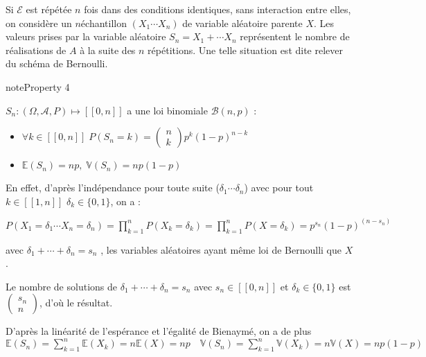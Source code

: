 \documentclass[letterpaper,10pt,english]{jupyterBook}
\begin{document}
\sphinxAtStartPar
Si \(\mathcal E\) est répétée \(n\) fois dans des conditions identiques, sans interaction entre elles, on considère un \(n\)\sphinxhyphen{}échantillon \((X_1\cdots X_n)\) de variable aléatoire parente \(X\). Les valeurs prises par la variable aléatoire \(S_n=X_1+\cdots X_n\) représentent le nombre de réalisations de \(A\) à la suite des \(n\) répétitions. Une telle situation est dite relever du schéma de Bernoulli.
\label{elemstats:property-1}
\begin{sphinxadmonition}{note}{Property 4}



\sphinxAtStartPar
\(S_n:(\Omega,\mathcal A,P)\mapsto [\![0,n]\!]\) a une loi binomiale \(\mathcal{B}(n,p)\) :
\begin{itemize}
\item {} 
\sphinxAtStartPar
\(\forall k\in[\![0,n]\!]\; P(S_n=k)=\begin{pmatrix}n\\k\end{pmatrix} p^k (1-p)^{n-k}\)

\item {} 
\sphinxAtStartPar
\(\mathbb{E}(S_n)=np,\; \mathbb{V}(S_n)=np(1-p)\)

\end{itemize}
\end{sphinxadmonition}

\sphinxAtStartPar
En effet, d’après l’indépendance pour toute suite (\(\delta_1\cdots \delta_n\)) avec pour tout \(k\in[\![1,n]\!]\) \(\delta_k\in\{0,1\}\), on a :

\sphinxAtStartPar
\(P(X_1=\delta_1\cdots X_n=\delta_n) = \displaystyle\prod_{k=1}^n P(X_k=\delta_k) = \displaystyle\prod_{k=1}^n P(X=\delta_k)=p^{s_n}(1-p)^{(n-s_n)}\)

\sphinxAtStartPar
avec \(\delta_1+\cdots+ \delta_n=s_n\) , les variables aléatoires ayant même loi de Bernoulli que \(X\).

\sphinxAtStartPar
Le nombre de solutions de \(\delta_1+\cdots+ \delta_n=s_n\) avec \(s_n\in[\![0,n]\!]\) et \(\delta_k\in\{0,1\}\) est \(\begin{pmatrix}s_n\\n\end{pmatrix}\), d’où le résultat.

\sphinxAtStartPar
D’après la linéarité de l’espérance et l’égalité de Bienaymé, on a de plus
\(\mathbb{E}(S_n) = \displaystyle\sum_{k=1}^n \mathbb{E}(X_k)=n\mathbb{E}(X)=np\quad \mathbb{V}(S_n)=\displaystyle\sum_{k=1}^n \mathbb{V}(X_k)=n\mathbb{V}(X)=np(1-p)\)
\end{document}
